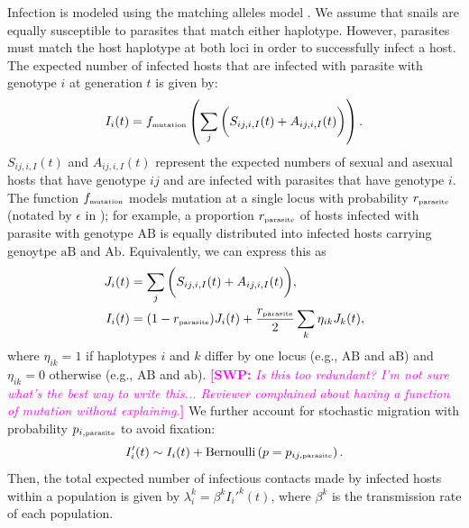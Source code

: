 \documentclass{article}\usepackage[]{graphicx}\usepackage[]{color}
\newcommand{\comment}[3]{\textcolor{#1}{\textbf{[#2: }\textit{#3}\textbf{]}}}
\newcommand{\swp}[1]{\comment{magenta}{SWP}{#1}}
\begin{document}
Infection is modeled using the matching alleles model \citep{hamilton1980sex,frank1997recognition,otto1998evolution}.
We assume that snails are equally susceptible to parasites that match either haplotype.
However, parasites must match the host haplotype at both loci in order to successfully infect a host.
The expected number of infected hosts that are infected with parasite with genotype $i$ at generation $t$ is given by:
\begin{equation}
I_{i}(t) = f_{\textrm{\tiny mutation}} \left( \sum_{j}  \bigg( S_{ij,i,I}(t) + A_{ij,i,I}(t)\bigg)\right).
\end{equation}
$S_{ij,i,I}(t)$ and $A_{ij,i,I}(t)$ represent the expected numbers of sexual and asexual hosts that have genotype $ij$ and are infected with parasites that have genotype $i$.
The function $f_{\textrm{\tiny mutation}}$ models mutation at a single locus with probability $r_{\textrm{\tiny parasite}}$ (notated by $\epsilon$ in \cite{ashby2015diversity});
for example, a proportion $r_{\textrm{\tiny parasite}}$ of hosts infected with parasite with genotype $\mathrm{AB}$ is equally distributed into infected hosts carrying genoytpe $\mathrm{aB}$ and $\mathrm{Ab}$.
Equivalently, we can express this as
\begin{equation}
\begin{aligned}
J_{i}(t) &= \sum_{j}  \bigg( S_{ij,i,I}(t) + A_{ij,i,I}(t)\bigg),\\
I_{i}(t) &= (1-r_{\textrm{\tiny parasite}}) J_i(t) + \frac{r_{\textrm{\tiny parasite}}}{2} \sum_{k} \eta_{ik} J_k(t),  \\
\end{aligned}
\end{equation}
where $\eta_{ik}=1$ if haplotypes $i$ and $k$ differ by one locus (e.g., $\mathrm{AB}$ and $\mathrm{aB}$) and $\eta_{ik}=0$ otherwise (e.g., $\mathrm{AB}$ and $\mathrm{ab}$).
\swp{Is this too redundant? I'm not sure what's the best way to write this... Reviewer complained about having a function of mutation without explaining.}
We further account for stochastic migration with probability $p_{i, \textrm{\tiny parasite}}$ to avoid fixation:
\begin{equation}
I_{i}'(t) \sim I_i(t) + \mathrm{Bernoulli}\left(p=p_{ij, \textrm{\tiny parasite}}\right).
\end{equation}
Then, the total expected number of infectious contacts made by infected hosts within a population is given by $\lambda_i^k = \beta^k {I_i'}^k(t)$, where $\beta^k$ is the transmission rate of each population. 
\end{document}
